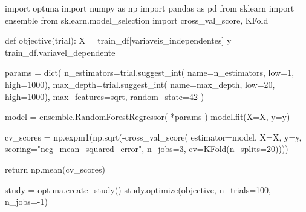 \documentclass[
  12pt,
  a4paper,
]{scrreprt}
\newenvironment{Shaded}{}{}
\newcommand{\BuiltInTok}[1]{\textcolor[rgb]{0.84,0.23,0.29}{#1}}
\newcommand{\ControlFlowTok}[1]{\textcolor[rgb]{0.84,0.23,0.29}{#1}}
\newcommand{\DecValTok}[1]{\textcolor[rgb]{0.00,0.36,0.77}{#1}}
\newcommand{\ImportTok}[1]{\textcolor[rgb]{0.01,0.18,0.38}{#1}}
\newcommand{\KeywordTok}[1]{\textcolor[rgb]{0.84,0.23,0.29}{#1}}
\newcommand{\NormalTok}[1]{\textcolor[rgb]{0.14,0.16,0.18}{#1}}
\newcommand{\OperatorTok}[1]{\textcolor[rgb]{0.14,0.16,0.18}{#1}}
\newcommand{\StringTok}[1]{\textcolor[rgb]{0.01,0.18,0.38}{#1}}
\begin{document}
\begin{Shaded}
\begin{Highlighting}[]
\ImportTok{import}\NormalTok{ optuna}
\ImportTok{import}\NormalTok{ numpy }\ImportTok{as}\NormalTok{ np}
\ImportTok{import}\NormalTok{ pandas }\ImportTok{as}\NormalTok{ pd}
\ImportTok{from}\NormalTok{ sklearn }\ImportTok{import}\NormalTok{ ensemble}
\ImportTok{from}\NormalTok{ sklearn.model\_selection }\ImportTok{import}\NormalTok{ cross\_val\_score, KFold}

\KeywordTok{def}\NormalTok{ objective(trial):}
\NormalTok{    X }\OperatorTok{=}\NormalTok{ train\_df[variaveis\_independentes]}
\NormalTok{    y }\OperatorTok{=}\NormalTok{ train\_df.variavel\_dependente}

\NormalTok{    params }\OperatorTok{=} \BuiltInTok{dict}\NormalTok{(}
\NormalTok{        n\_estimators}\OperatorTok{=}\NormalTok{trial.suggest\_int(}
\NormalTok{          name}\OperatorTok{=}\StringTok{\textquotesingle{}n\_estimators\textquotesingle{}}\NormalTok{,}
\NormalTok{          low}\OperatorTok{=}\DecValTok{1}\NormalTok{,}
\NormalTok{          high}\OperatorTok{=}\DecValTok{1000}\NormalTok{),}
\NormalTok{        max\_depth}\OperatorTok{=}\NormalTok{trial.suggest\_int(}
\NormalTok{          name}\OperatorTok{=}\StringTok{\textquotesingle{}max\_depth\textquotesingle{}}\NormalTok{,}
\NormalTok{          low}\OperatorTok{=}\DecValTok{20}\NormalTok{,}
\NormalTok{          high}\OperatorTok{=}\DecValTok{1000}\NormalTok{),}
\NormalTok{        max\_features}\OperatorTok{=}\StringTok{\textquotesingle{}sqrt\textquotesingle{}}\NormalTok{,}
\NormalTok{        random\_state}\OperatorTok{=}\DecValTok{42}
\NormalTok{    )}

\NormalTok{    model }\OperatorTok{=}\NormalTok{ ensemble.RandomForestRegressor(}
        \OperatorTok{*}\NormalTok{params}
\NormalTok{    )}
\NormalTok{    model.fit(X}\OperatorTok{=}\NormalTok{X, y}\OperatorTok{=}\NormalTok{y)}

\NormalTok{    cv\_scores }\OperatorTok{=}\NormalTok{ np.expm1(np.sqrt(}\OperatorTok{{-}}\NormalTok{cross\_val\_score(}
\NormalTok{        estimator}\OperatorTok{=}\NormalTok{model,}
\NormalTok{        X}\OperatorTok{=}\NormalTok{X,}
\NormalTok{        y}\OperatorTok{=}\NormalTok{y,}
\NormalTok{        scoring}\OperatorTok{=}\StringTok{"neg\_mean\_squared\_error"}\NormalTok{,}
\NormalTok{        n\_jobs}\OperatorTok{=}\DecValTok{3}\NormalTok{,}
\NormalTok{        cv}\OperatorTok{=}\NormalTok{KFold(n\_splits}\OperatorTok{=}\DecValTok{20}\NormalTok{))))}

    \ControlFlowTok{return}\NormalTok{ np.mean(cv\_scores)}

\NormalTok{study }\OperatorTok{=}\NormalTok{ optuna.create\_study()}
\NormalTok{study.optimize(objective, n\_trials}\OperatorTok{=}\DecValTok{100}\NormalTok{, n\_jobs}\OperatorTok{={-}}\DecValTok{1}\NormalTok{)}
\end{Highlighting}
\end{Shaded}
\end{document}
